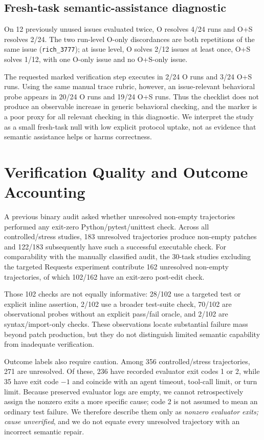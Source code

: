 \documentclass[10pt,twocolumn]{article}
\begin{document}
\subsection{Fresh-task semantic-assistance diagnostic}
On 12 previously unused issues evaluated twice, O resolves 4/24 runs and O+S resolves 2/24. The two run-level O-only discordances are both repetitions of the same issue (\texttt{rich\_3777}); at issue level, O solves 2/12 issues at least once, O+S solves 1/12, with one O-only issue and no O+S-only issue.

The requested marked verification step executes in 2/24 O runs and 3/24 O+S runs. Using the same manual trace rubric, however, an issue-relevant behavioral probe appears in 20/24 O runs and 19/24 O+S runs. Thus the checklist does not produce an observable increase in generic behavioral checking, and the marker is a poor proxy for all relevant checking in this diagnostic. We interpret the study as a small fresh-task null with low explicit protocol uptake, not as evidence that semantic assistance helps or harms correctness.

\section{Verification Quality and Outcome Accounting}
A previous binary audit asked whether unresolved non-empty trajectories performed any exit-zero Python/pytest/unittest check. Across all controlled/stress studies, 183 unresolved trajectories produce non-empty patches and 122/183 subsequently have such a successful executable check. For comparability with the manually classified audit, the 30-task studies excluding the targeted Requests experiment contribute 162 unresolved non-empty trajectories, of which 102/162 have an exit-zero post-edit check.

Those 102 checks are not equally informative: 28/102 use a targeted test or explicit inline assertion, 2/102 use a broader test-suite check, 70/102 are observational probes without an explicit pass/fail oracle, and 2/102 are syntax/import-only checks. These observations locate substantial failure mass beyond patch production, but they do not distinguish limited semantic capability from inadequate verification.

Outcome labels also require caution. Among 356 controlled/stress trajectories, 271 are unresolved. Of these, 236 have recorded evaluator exit codes 1 or 2, while 35 have exit code $-1$ and coincide with an agent timeout, tool-call limit, or turn limit. Because preserved evaluator logs are empty, we cannot retrospectively assign the nonzero exits a more specific cause; code 2 is not assumed to mean an ordinary test failure. We therefore describe them only as \emph{nonzero evaluator exits; cause unverified}, and we do not equate every unresolved trajectory with an incorrect semantic repair.
\end{document}
